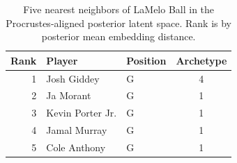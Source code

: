 \begin{table}[htbp]
  \centering\small
  \begin{tabular}{rllc}
    \toprule
    Rank & Player & Position & Archetype \\
    \midrule
    1 & Josh Giddey & G & 4 \\
    2 & Ja Morant & G & 1 \\
    3 & Kevin Porter Jr. & G & 1 \\
    4 & Jamal Murray & G & 1 \\
    5 & Cole Anthony & G & 1 \\
    \bottomrule
  \end{tabular}
  \caption{Five nearest neighbors of LaMelo Ball in the Procrustes-aligned posterior latent space. Rank is by posterior mean embedding distance.}
  \label{tab:LaMelo_Ball_neighbors}
\end{table}


